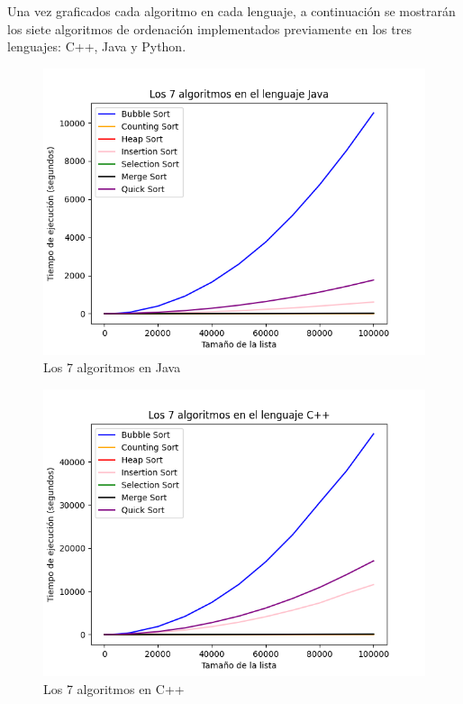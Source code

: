Una vez graficados cada algoritmo en cada lenguaje, a continuación se mostrarán los siete algoritmos de ordenación implementados previamente en los tres lenguajes: C++, Java y Python.

\begin{figure}[h]
    \centering
    \includegraphics[scale=.60]{img/Java.png}
    \caption{Los 7 algoritmos en Java}
    \label{fig:primera_figura}
\end{figure}

\vspace{2cm}
\begin{figure}[h]
    \centering
    \includegraphics[scale=.60]{img/CPP.png}
    \caption{Los 7 algoritmos en C++}
    \label{fig:primera_figura}
\end{figure}

